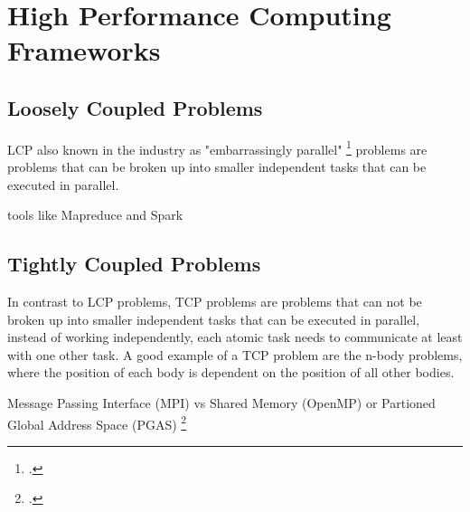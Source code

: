 \section{High Performance Computing Frameworks}


\subsection{Loosely Coupled Problems}

\ac{LCP} also known in the industry as "embarrassingly parallel" \footcite{smtn} problems are problems that can be broken up into smaller independent tasks that can be executed in parallel.


tools like Mapreduce and Spark



\subsection{Tightly Coupled Problems}
\label{state_of_the_art_tcp}
In contrast to \ac{LCP} problems, \ac{TCP} problems are problems that can not be broken up into smaller independent tasks that can be executed in parallel,
instead of working independently, each atomic task needs to communicate at least with one other task.
A good example of a \ac{TCP} problem are the n-body problems, where the position of each body is dependent on the position of all other bodies.

Message Passing Interface (MPI) vs Shared Memory (OpenMP) or Partioned Global Address Space (PGAS) \footcite{smtn} 